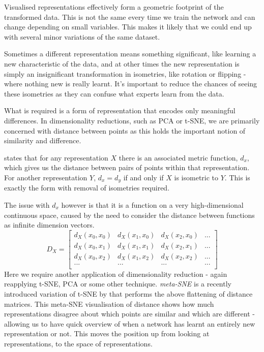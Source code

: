 \documentclass[a4paper,11pt,titlepage]{article}
\begin{document}
		Visualised representations effectively form a geometric footprint of the transformed data. This is not the same every time we train the network and can change depending on small variables. This makes it likely that we could end up with several minor variations of the same dataset.
		\par 
		Sometimes a different representation means something significant, like learning a new characteristic of the data, and at other times the new representation is simply an insignificant transformation in isometries, like rotation or flipping - where nothing new is really learnt. It's important to reduce the chances of seeing these isometries as they can confuse what experts learn from the data.
		\par 
		What is required is a form of representation that encodes only meaningful differences. In dimensionality reductions, such as PCA or t-SNE, we are primarily concerned with distance between points as this holds the important notion of similarity and difference.
		\par 
		\cite{Olah2014} states that for any representation $ X $ there is an associated metric function, $ d_{x} $, which gives us the distance between pairs of points within that representation. For another representation $ Y $, $ d_{x} = d_{y} $ if and only if $ X $ is isometric to $ Y $. This is exactly the form with removal of isometries required.
		\par 
		The issue with $ d_{x} $ however is that it is a function on a very high-dimensional continuous space, caused by the need to consider the distance between functions as infinite dimension vectors. 
		$$
		D_X = \left[\begin{array}{cccc} 
		  d_X(x_0, x_0) & d_X(x_1, x_0) & d_X(x_2, x_0) & ... \\
		  d_X(x_0, x_1) & d_X(x_1, x_1) & d_X(x_2, x_1) & ... \\
		  d_X(x_0, x_2) & d_X(x_1, x_2) & d_X(x_2, x_2) & ... \\
		  ... & ... & ... & ... \\ 
		\end{array} \right]
		$$
		Here we require another application of dimensionality reduction - again reapplying t-SNE, PCA or some other technique. \textit{meta-SNE} is a recently introduced variation of t-SNE by \cite{Olah2014} that performs the above flattening of distance matrices. This meta-SNE visualisation of distance shows how much representations disagree about which points are similar and which are different - allowing us to have quick overview of when a network has learnt an entirely new representation or not. This moves the position up from looking at representations, to the space of representations.
		\par 
		
\end{document}
